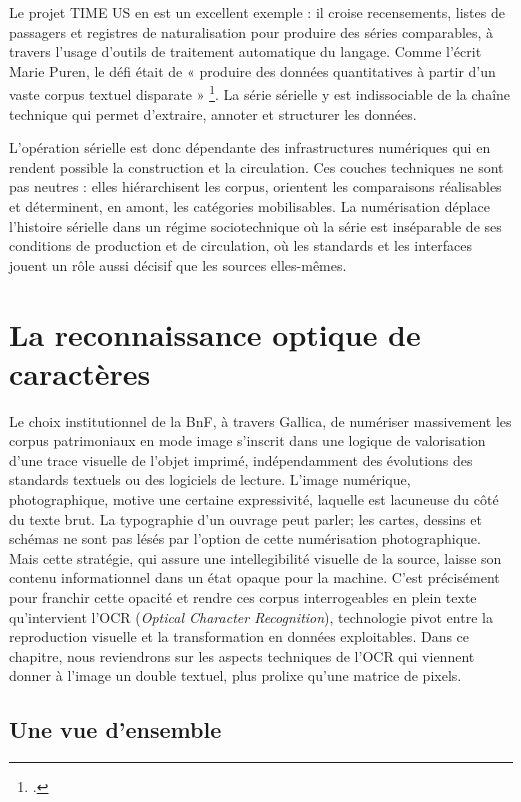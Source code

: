 Le projet TIME US en est un excellent exemple : il croise recensements, listes de passagers et registres de naturalisation pour produire des séries comparables, à travers l’usage d’outils de traitement automatique du langage. Comme l’écrit Marie Puren, le défi était de « produire des données quantitatives à partir d’un vaste corpus textuel disparate » \footcite[][p. 5]{purentimeus}. La série sérielle y est indissociable de la chaîne technique qui permet d’extraire, annoter et structurer les données.

L’opération sérielle est donc dépendante des infrastructures numériques qui en rendent possible la construction et la circulation. Ces couches techniques ne sont pas neutres : elles hiérarchisent les corpus, orientent les comparaisons réalisables et déterminent, en amont, les catégories mobilisables. La numérisation déplace l'histoire sérielle dans un régime sociotechnique où la série est inséparable de ses conditions de production et de circulation, où les standards et les interfaces jouent un rôle aussi décisif que les sources elles-mêmes.

\chapter{La reconnaissance optique de caractères}

Le choix institutionnel de la BnF, à travers Gallica, de numériser massivement les corpus patrimoniaux en mode image s’inscrit dans une logique de valorisation d'une trace visuelle de l’objet imprimé, indépendamment des évolutions des standards textuels ou des logiciels de lecture. L’image numérique, photographique, motive une certaine expressivité, laquelle est lacuneuse du côté du texte brut. La typographie d'un ouvrage peut parler; les cartes, dessins et schémas ne sont pas lésés par l'option de cette numérisation photographique. Mais cette stratégie, qui assure une intellegibilité visuelle de la source, laisse son contenu informationnel dans un état opaque pour la machine. C’est précisément pour franchir cette opacité et rendre ces corpus interrogeables en plein texte qu’intervient l’OCR (\emph{Optical Character Recognition}), technologie pivot entre la reproduction visuelle et la transformation en données exploitables. Dans ce chapitre, nous reviendrons sur les aspects techniques de l'OCR qui viennent donner à l'image un double textuel, plus prolixe qu'une matrice de pixels.

\section{Une vue d'ensemble}

